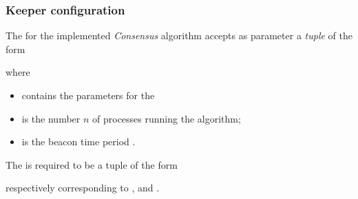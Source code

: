 \subsubsection{Keeper configuration}
\label{subsub:ConfKeeperParams}

    The  for the implemented \emph{Consensus}
    algorithm accepts as parameter a \emph{tuple} of the form
    \begin{quote}
    \centering
    \end{quote}
    where
    \begin{itemize}
    \item   {} contains the parameters for the
    \item   {} is the number $n$ of processes running the
            algorithm;
    \item   {} is the beacon time period .
    \end{itemize}

    The  is required to be a tuple of the form
    \begin{quote}
    \centering
    \end{quote}
    respectively corresponding to , 
    and .
 
